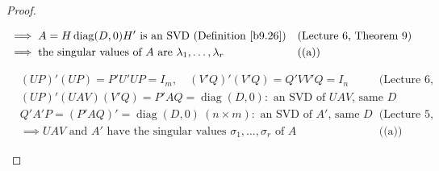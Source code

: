 \documentclass[12pt]{article}
\DeclareMathOperator{\diag}{diag}
\DeclareMathOperator{\rank}{rank}
\theoremstyle{definition}
\newcommand{\lec}[1]{Lecture~#1}
\newcommand{\boardtop}{\vspace*{-\abovedisplayskip}}
\begin{document}
\begin{proof}
\begin{board}[(e) \(A\ne0\) PSD; \(H\), \(\lambda_i\): the \(Q\), \(\lambda_i\) of \lec{9}, Theorem~13, for \(A\);
\(r=\rank A\):]
\begin{align*}
&\implies A=H\diag(D,0)H'\text{ is an SVD (Definition~\ref{b9.26})}&&\text{(\lec{6}, Theorem~9)}\\
&\implies\text{the singular values of \(A\) are }\lambda_1,\dots,\lambda_r&&\text{((a))}
\end{align*}
\end{board}
\begin{board}
\boardtop
\begin{align*}
&(UP)'(UP)=P'U'UP=I_m,\quad(V'Q)'(V'Q)=Q'VV'Q=I_n&&\text{(\lec{6}, Theorem~9)}\\
&(UP)'(UAV)(V'Q)=P'AQ=\diag(D,0)\colon\text{ an SVD of }UAV\text{, same }D\\
&Q'A'P=(P'AQ)'=\diag(D,0)\ (n\times m)\colon\text{ an SVD of }A'\text{, same }D&&\text{(\lec{5}, Theorem~2(b))}\\
&\implies UAV\text{ and }A'\text{ have the singular values \(\sigma_1,\dots,\sigma_r\) of }A&&\text{((a))}
\end{align*}
\end{board}
\nopagebreak
\end{proof}
\end{document}
